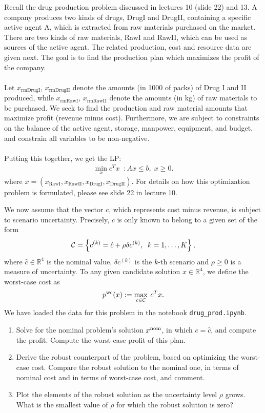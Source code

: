\documentclass[11pt]{article}
\begin{document}
Recall the drug production problem discussed in lectures 10 (slide 22) and 13. A company produces two kinds of drugs, DrugI and DrugII, containing a specific active agent A, which is extracted from raw materials purchased on the market. There are two kinds of raw materials, RawI and RawII, which can be used as sources of the active agent.  The related production, cost and resource data are given next.  The goal is to find the production plan which maximizes the profit of the company. \\ \\
Let $x_{\text{rmDrugI}}$, $x_{\text{rmDrugII}}$ denote the amounts (in 1000 of packs) of Drug I and II produced, while $x_{\text{rmRawI}}$, $x_{\text{rmRawII}}$ denote the amounts (in kg) of raw materials to be purchased. We seek to find the production and raw material amounts that maximize profit (revenue minus cost). Furthermore, we are subject to constraints on the balance of the active agent, storage, manpower, equipment, and budget, and constrain all variables to be non-negative. \\ \\

Putting this together, we get the LP:
\begin{align*}
    \min_{x} c^T x \; \; : Ax \leq b, \; x \geq 0.
\end{align*}
where $x= (x_{\text{RawI}},x_{\text{RawII}},x_{\text{DrugI}},x_{\text{DrugII}})$. For details on how this optimization problem is formulated, please see slide 22 in lecture 10.

We now assume that the vector $c$, which represents cost minus revenue, is subject to scenario uncertainty. Precisely, $c$ is only known to belong to a given set of the form
\[
{\cal C} = \left\{ c^{(k)} = \hat{c} + \rho \delta c^{(k)}, \;\; k=1,\ldots,K \right\},
\]
where $\hat{c} \in \mathbb{R}^{4}$ is the nominal value, $\delta c^{(k)}$ is the $k$-th scenario and $\rho \geq 0$ is a measure of uncertainty. To any given candidate solution $x \in \mathbb{R}^{4}$, we define the worst-case cost as
\[
p^{\rm wc}(x) := \max_{c \in {\cal C}} \: c^Tx.
\]
We have loaded the data for this problem in the notebook {\tt drug\_prod.ipynb}.
\begin{enumerate}
\item Solve for the nominal problem's solution $x^{\rm nom}$, in which $c = \hat{c}$, and compute the profit. Compute the worst-case profit of this plan.

\item Derive the robust counterpart of the problem, based on optimizing the worst-case cost. Compare the robust solution to the nominal one, in terms of nominal cost and in terms of worst-case cost, and comment.

\item Plot the elements of the robust solution as the uncertainty level $\rho$ grows. What is the smallest value of $\rho$ for which the robust solution is zero?

\end{enumerate}
\end{document}

